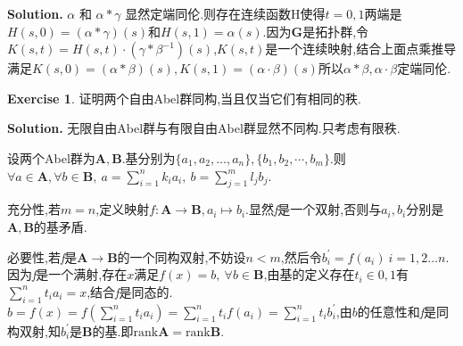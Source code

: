 \documentclass[a4paper]{book}
\newcommand{\rank}{\mathrm{rank}}
\newenvironment{solution}%
{\noindent\textbf{Solution.}}%
{\qedhere}
\numberwithin{equation}{chapter}
\theoremstyle{definition}
\newtheorem{exc}[exm]{Exercise}
\begin{document}
\begin{multicols}{2}
\begin{solution}
	$\alpha$ 和 $\alpha * \gamma$ 显然定端同伦.则存在连续函数H使得$t = 0,1$两端是$H(s,0) = (\alpha*\gamma)(s)$和$H(s,1) = \alpha(s)$.因为$\mathbf{G}$是拓扑群,令$K(s,t) = H(s,t) \cdot (\gamma * \beta^{-1})(s)$,$K(s,t)$是一个连续映射,结合上面点乘推导满足$K(s,0) = (\alpha * \beta)(s),K(s,1) = (\alpha \cdot \beta)(s)$所以$\alpha * \beta, \alpha \cdot \beta$定端同伦.
\end{solution}

\begin{exc}
	证明两个自由Abel群同构,当且仅当它们有相同的秩.
\end{exc}

\begin{solution}
	无限自由Abel群与有限自由Abel群显然不同构.只考虑有限秩.
	
	设两个Abel群为$ \mathbf{A,B} $.基分别为$ \{a_1,a_2, \dots, a_n\}, \{b_1,b_2, \cdots , b_m\} $.则$ \forall a \in \mathbf{A},\forall b \in \mathbf{B},\ a = \sum_{i=1}^{n} k_i a_i,\ b = \sum_{j=1}^{m} l_j b_j $.
	
	充分性,若$ m = n $,定义映射$ f: \mathbf{A} \rightarrow \mathbf{B}, a_i \mapsto b_i $.显然\textit{f}是一个双射,否则与$ a_i, b_i $分别是$ \mathbf{A}, \mathbf{B} $的基矛盾.
	
	必要性,若\textit{f}是$ \mathbf{A} \rightarrow \mathbf{B} $的一个同构双射,不妨设$ n < m $,然后令$ b_i^\prime = f(a_i) \ i = 1,2 \dots n $.因为\textit{f}是一个满射,存在$ x $满足$ f(x) = b, \ \forall b \in \mathbf{B} $,由基的定义存在$ t_i \in {0,1} $有$ \sum_{i = 1}^{n} t_i a_i = x $,结合\textit{f}是同态的.$ b = f(x) = f(\sum_{i=1}^{n} t_i a_i) = \sum_{i=1}^{n} t_i f(a_i) = \sum_{i = 1}^{n} t_i b_i^\prime $,由$ b $的任意性和\textit{f}是同构双射,知$ {b_i^\prime} $是$ \mathbf{B} $的基.即$ \rank \mathbf{A} = \rank \mathbf{B} $.
\end{solution}

%

%

%


\end{multicols}
\end{document}
